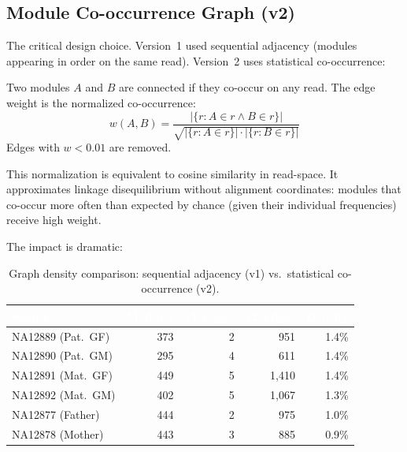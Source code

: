 \documentclass{../yalumba}
\begin{document}
\subsection{Module Co-occurrence Graph (v2)}

The critical design choice.  Version~1 used sequential adjacency (modules
appearing in order on the same read).  Version~2 uses statistical
co-occurrence:

\begin{definition}
Two modules $A$ and $B$ are connected if they co-occur on any read.  The edge
weight is the normalized co-occurrence:
\begin{equation}
  w(A, B) = \frac{|\{r : A \in r \wedge B \in r\}|}
                  {\sqrt{|\{r : A \in r\}| \cdot |\{r : B \in r\}|}}
  \label{eq:cooccurrence}
\end{equation}
Edges with $w < 0.01$ are removed.
\end{definition}


This normalization is equivalent to cosine similarity in read-space.  It
approximates linkage disequilibrium without alignment coordinates: modules that
co-occur more often than expected by chance (given their individual frequencies)
receive high weight.

The impact is dramatic:

\begin{table}[H]
  \centering
  \tablestyle
  \caption{Graph density comparison: sequential adjacency (v1) vs.\ statistical
    co-occurrence (v2).}
  \label{tab:density}
  \begin{tabular}{lrrrr}
    \toprule
    \rowcolor{table-header}
    \textcolor{white}{\textbf{Sample}} &
    \textcolor{white}{\textbf{Modules}} &
    \textcolor{white}{\textbf{v1 Edges}} &
    \textcolor{white}{\textbf{v2 Edges}} &
    \textcolor{white}{\textbf{Density}} \\
    \midrule
    NA12889 (Pat.\ GF) & 373 & 2 & 951 & 1.4\% \\
    NA12890 (Pat.\ GM) & 295 & 4 & 611 & 1.4\% \\
    NA12891 (Mat.\ GF) & 449 & 5 & 1{,}410 & 1.4\% \\
    NA12892 (Mat.\ GM) & 402 & 5 & 1{,}067 & 1.3\% \\
    NA12877 (Father)    & 444 & 2 & 975 & 1.0\% \\
    NA12878 (Mother)    & 443 & 3 & 885 & 0.9\% \\
    \bottomrule
  \end{tabular}
\end{table}
\end{document}
